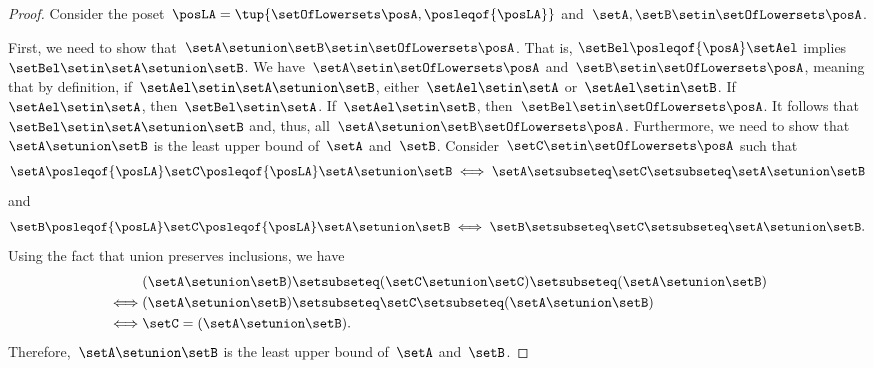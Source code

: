 \begin{proof}
    Consider the poset~$\posLA=\tup{\setOfLowersets \posA, \posleqof{\posLA}}$ and~$\setA,\setB\setin \setOfLowersets \posA$.

    First, we need to show that~$\setA\setunion \setB\setin \setOfLowersets \posA$.
    That is, $\setBel \posleqof{\posA} \setAel$ implies $\setBel \setin \setA\setunion \setB$.
    We have~$\setA \setin \setOfLowersets \posA$ and~$\setB\setin \setOfLowersets \posA$, meaning that by definition, if~$\setAel\setin \setA\setunion \setB$, either~$\setAel\setin \setA$ or~$\setAel\setin \setB$.
    If~$\setAel\setin \setA$, then~$\setBel\setin \setA$.
    If~$\setAel\setin \setB$, then~$\setBel\setin \setOfLowersets \posA$.
    It follows that~$\setBel\setin \setA\setunion \setB$ and, thus, all~$\setA\setunion \setB\setOfLowersets \posA$.
    Furthermore, we need to show that~$\setA\setunion \setB$ is the least upper bound of~$\setA$ and~$\setB$.
    Consider~$\setC\setin \setOfLowersets \posA$ such that
    \[
        \setA\posleqof{\posLA} \setC\posleqof{\posLA} \setA\setunion \setB
        \iff
        \setA\setsubseteq \setC\setsubseteq \setA\setunion \setB
    \]
    and
    \[
        \setB\posleqof{\posLA} \setC\posleqof{\posLA} \setA\setunion \setB
        \iff
        \setB\setsubseteq \setC\setsubseteq \setA\setunion \setB.
    \]
    Using the fact that union preserves inclusions, we have
    \begin{equation*}
        \begin{aligned}
                 & (\setA\setunion \setB)
            \setsubseteq (\setC \setunion \setC) \setsubseteq (\setA \setunion \setB) \\
            \iff & (\setA\setunion \setB) \setsubseteq \setC \setsubseteq (\setA\setunion \setB) \\
            \iff & \setC                   = (\setA\setunion \setB).
        \end{aligned}
    \end{equation*}
    Therefore,~$\setA\setunion \setB$ is the least upper bound of~$\setA$ and~$\setB$.


\end{proof}
